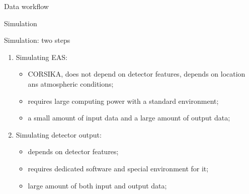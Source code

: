 \documentclass[18pt]{beamer}
\newcommand{\insimg}[1]{
\begin{tikzpicture}[remember picture,overlay]
  \node[xshift=-7.7ex,yshift=12ex] at (current page.south east){%
    \texttt{[image: pics/\#1]}
  };
\end{tikzpicture}
}
\begin{document}

\begin{frame}{Data workflow}
\vspace{-2em}
\centering
{}
\end{frame}

\begin{frame}{Simulation}
\begin{block}{Simulation: two steps}
\begin{enumerate}
\item Simulating EAS:
  \begin{itemize}
  \item CORSIKA, does not depend on detector features, depends on location ans atmospheric conditions;
  \item requires large computing power with a standard environment;
  \item a small amount of input data and a large amount of output data;
  \end{itemize}
\item Simulating detector output:
  \begin{itemize}
  \item depends on detector features;
  \item requires dedicated software and special environment for it;
  \item large amount of both input and output data;
  \end{itemize}
\end{enumerate}
\end{block}
\end{frame}
\end{document}
